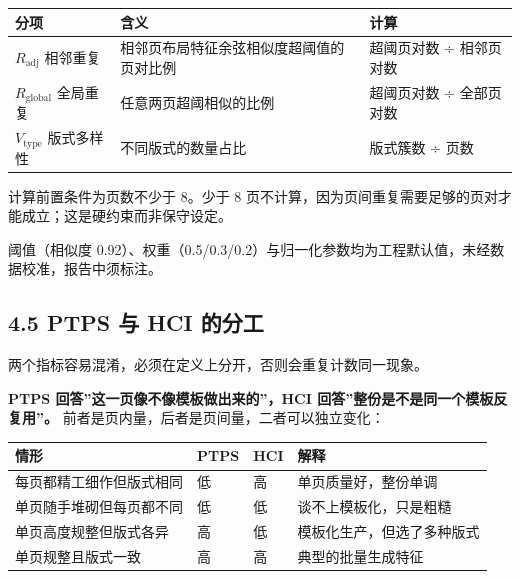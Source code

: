 \documentclass[
  11pt,
]{article}
\newcounter{none} %
\begin{document}
{\def\LTcaptype{none} %
\begin{longtable}[]{@{}
  >{\raggedright\arraybackslash}p{}
  >{\raggedright\arraybackslash}p{}
  >{\raggedright\arraybackslash}p{}@{}}
\toprule\noalign{}
\begin{minipage}[b]{\linewidth}\raggedright
分项
\end{minipage} & \begin{minipage}[b]{\linewidth}\raggedright
含义
\end{minipage} & \begin{minipage}[b]{\linewidth}\raggedright
计算
\end{minipage} \\
\midrule\noalign{}
\endhead
\bottomrule\noalign{}
\endlastfoot
\(R_{\text{adj}}\) 相邻重复 & 相邻页布局特征余弦相似度超阈值的页对比例 &
超阈页对数 ÷ 相邻页对数 \\
\(R_{\text{global}}\) 全局重复 & 任意两页超阈相似的比例 & 超阈页对数 ÷
全部页对数 \\
\(V_{\text{type}}\) 版式多样性 & 不同版式的数量占比 & 版式簇数 ÷ 页数 \\
\end{longtable}
}

计算前置条件为页数不少于 8。少于 8
页不计算，因为页间重复需要足够的页对才能成立；这是硬约束而非保守设定。

阈值（相似度
0.92）、权重（0.5/0.3/0.2）与归一化参数均为工程默认值，未经数据校准，报告中须标注。

\subsection{4.5 PTPS 与 HCI
的分工}\label{ptps-ux4e0e-hci-ux7684ux5206ux5de5}

两个指标容易混淆，必须在定义上分开，否则会重复计数同一现象。

\textbf{PTPS 回答''这一页像不像模板做出来的''，HCI
回答''整份是不是同一个模板反复用''。}
前者是页内量，后者是页间量，二者可以独立变化：

{\def\LTcaptype{none} %
\begin{longtable}[]{@{}llll@{}}
\toprule\noalign{}
情形 & PTPS & HCI & 解释 \\
\midrule\noalign{}
\endhead
\bottomrule\noalign{}
\endlastfoot
每页都精工细作但版式相同 & 低 & 高 & 单页质量好，整份单调 \\
单页随手堆砌但每页都不同 & 低 & 低 & 谈不上模板化，只是粗糙 \\
单页高度规整但版式各异 & 高 & 低 & 模板化生产，但选了多种版式 \\
单页规整且版式一致 & 高 & 高 & 典型的批量生成特征 \\
\end{longtable}
}
\end{document}
